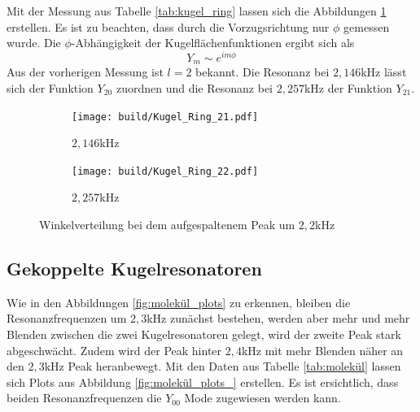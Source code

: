 Mit der Messung aus Tabelle \ref{tab:kugel_ring} lassen sich die Abbildungen \ref{fig:kugel_ring} erstellen.
Es ist zu beachten, dass durch die Vorzugsrichtung nur $\phi$ gemessen wurde.
Die $\phi$-Abhängigkeit der Kugelflächenfunktionen ergibt sich als
\begin{equation}
  Y_m \sim e^{im\phi}
\end{equation}
Aus der vorherigen Messung ist $l=2$ bekannt.
Die Resonanz bei $2,146$kHz lässt sich der Funktion $Y_{20}$ zuordnen und die Resonanz bei $2,257$kHz  der Funktion $Y_{21}$.
\begin{figure}
  \centering
  \begin{subfigure}{0.4\textwidth}
    \centering
    \texttt{[image: build/Kugel\_Ring\_21.pdf]}
    \caption{$2,146$kHz}
  \end{subfigure}
  \begin{subfigure}{0.4\textwidth}
    \centering
    \texttt{[image: build/Kugel\_Ring\_22.pdf]}
    \caption{$2,257$kHz}
  \end{subfigure}
  \caption{Winkelverteilung bei dem aufgespaltenem Peak um $2,2$kHz}
  \label{fig:kugel_ring}
\end{figure}

\subsection{Gekoppelte Kugelresonatoren}
Wie in den Abbildungen \ref{fig:molekül_plots} zu erkennen, bleiben die Resonanzfrequenzen um $2,3$kHz zunächst bestehen,
werden aber mehr und mehr Blenden zwischen die zwei Kugelresonatoren gelegt, wird der zweite Peak stark abgeschwächt.
Zudem wird der Peak hinter $2,4$kHz mit mehr Blenden näher an den $2,3$kHz Peak heranbewegt.
Mit den Daten aus Tabelle \ref{tab:molekül} lassen sich Plots aus Abbildung \ref{fig:molekül_plots_} erstellen.
Es ist ersichtlich, dass beiden Resonanzfrequenzen die $Y_{00}$ Mode zugewiesen werden kann.

